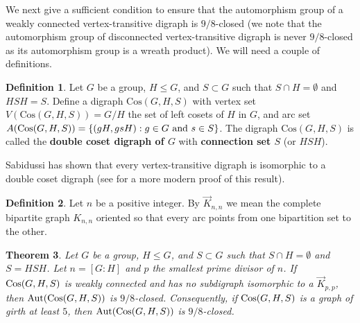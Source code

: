 \documentclass{amsart}
\newtheorem{thrm}{Theorem}[section]
\theoremstyle{definition}
\newtheorem{definition}[thrm]{Definition}
\theoremstyle{remark}
\numberwithin{equation}{section}
\def\Aut{{\rm Aut}}
\def\Cos{{\rm Cos}}
\begin{document}
We next give a sufficient condition to ensure that the automorphism group of a weakly connected vertex-transitive digraph is $9/8$-closed (we note that the automorphism group of disconnected vertex-transitive digraph is never $9/8$-closed as its automorphism group is a wreath product).  We will need a couple of definitions.

\begin{definition}
Let $G$ be a group, $H \leq G$, and $S \subset G$ such that $S\cap H = \emptyset$ and $HSH = S$. Define a digraph $\text{Cos}(G,H,S)$ with vertex set $V(\text{Cos}(G,H,S)) = G/H$ the set of left cosets of $H$ in $G$, and arc set $A(\text{Cos}(G,H,S)) = \{(gH,gsH):g\in G{\rm\ and\ }s\in S\}$. The digraph $\text{Cos}(G,H,S)$ is called the \textbf{double coset digraph of $G$} with \textbf{connection set $S$} (or $HSH$).
\end{definition}

Sabidussi has shown \cite[Theorem 2]{Sabidussi1964} that every vertex-transitive digraph is isomorphic to a double coset digraph (see \cite[Theorem 1.3.9]{Book} for a more modern proof of this result).

\begin{definition}
Let $n$ be a positive integer.  By $\vec{K}_{n,n}$ we mean the complete bipartite graph $K_{n,n}$ oriented so that every arc points from one bipartition set to the other.
\end{definition}

\begin{thrm}\label{graph 9/8 closed}
Let $G$ be a group, $H\le G$, and $S\subset G$ such that $S\cap H = \emptyset$ and $S = HSH$.  Let $n = [G:H]$ and $p$ the smallest prime divisor of $n$.  If $\Cos(G,H,S)$ is weakly connected and has no subdigraph isomorphic to a $\vec{K}_{p,p}$, then $\Aut(\Cos(G,H,S))$ is $9/8$-closed.  Consequently, if $\Cos(G,H,S)$ is a graph of girth at least $5$, then $\Aut(\Cos(G,H,S))$ is $9/8$-closed.
\end{thrm}
\end{document}
